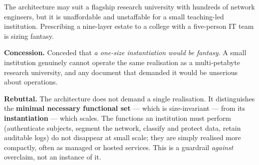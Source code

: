 \documentclass[11pt,a4paper,twoside]{book}
\newcommand{\keyword}[1]{\textbf{#1}}
\begin{document}
\begin{questionbox}
The architecture may suit a flagship research university with hundreds of
network engineers, but it is unaffordable and unstaffable for a small
teaching-led institution. Prescribing a nine-layer estate to a college with
a five-person IT team is sizing fantasy.
\end{questionbox}

\begin{answerbox}[Response O3.1]
\textbf{Concession.} Conceded that \emph{a one-size instantiation would be
fantasy}. A small institution genuinely cannot operate the same realisation
as a multi-petabyte research university, and any document that demanded it
would be unserious about operations.

\medskip
\textbf{Rebuttal.} The architecture does not demand a single realisation. It
distinguishes the \keyword{minimal necessary functional set} --- which is
size-invariant --- from its \keyword{instantiation} --- which scales. The
functions an institution must perform (authenticate subjects, segment the
network, classify and protect data, retain auditable logs) do not disappear
at small scale; they are simply realised more compactly, often as managed or
hosted services. This is a guardrail \emph{against} overclaim, not an
instance of it.


\end{answerbox}
\end{document}
